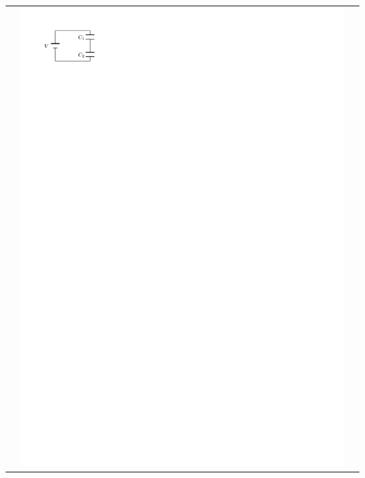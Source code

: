 \documentclass{article}
\begin{document}
\begin{tabularx}{\textwidth}{X | X | X}
      &
      \includegraphics{figures/capacitors-in-series.pdf}
      &

\end{tabularx}
\end{document}
